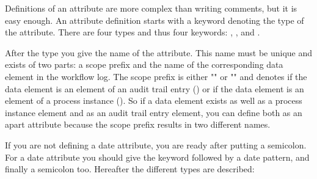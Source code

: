 Definitions of an attribute are more complex than writing comments, but it is easy
enough. An attribute definition starts with a keyword denoting the type of the
attribute. There are four types and thus four keywords: ,
,  and .

After the type you give the name of the attribute. This name must be unique
and exists of two parts: a scope prefix and the name of the corresponding data
element in the workflow log. The scope prefix is either ""
or "" and denotes if the data element is an element of an audit trail
entry () or if the data element is an element of a process instance
(). So if a data element exists as well as a process instance element
and as an audit trail entry element, you can define both as an apart attribute
because the scope prefix results in two different names.

If you are not defining a date attribute, you are ready after putting a
semicolon. For a date attribute you should give the \ltl{:=} keyword followed
by a date pattern, and finally a semicolon too. Hereafter the different types
are described:

